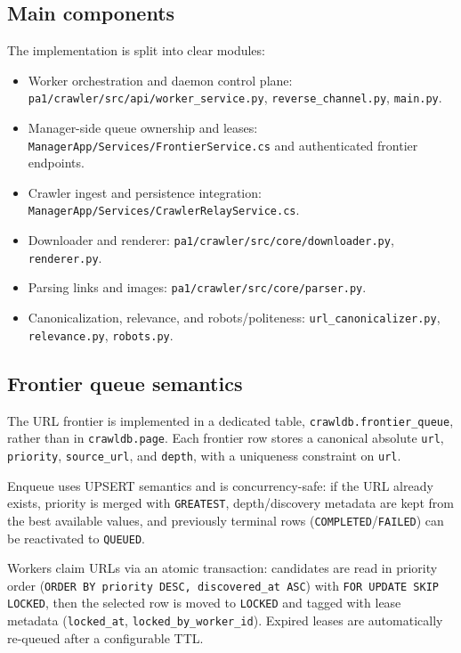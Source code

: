 \documentclass[9pt]{IEEEtran}
\begin{document}
\subsection{Main components}
The implementation is split into clear modules:
\begin{itemize}
    \item Worker orchestration and daemon control plane: \texttt{pa1/crawler/src/api/worker\_service.py}, \texttt{reverse\_channel.py}, \texttt{main.py}.
    \item Manager-side queue ownership and leases: \texttt{ManagerApp/Services/FrontierService.cs} and authenticated frontier endpoints.
    \item Crawler ingest and persistence integration: \texttt{ManagerApp/Services/CrawlerRelayService.cs}.
    \item Downloader and renderer: \texttt{pa1/crawler/src/core/downloader.py}, \texttt{renderer.py}.
    \item Parsing links and images: \texttt{pa1/crawler/src/core/parser.py}.
    \item Canonicalization, relevance, and robots/politeness: \texttt{url\_canonicalizer.py}, \texttt{relevance.py}, \texttt{robots.py}.
\end{itemize}

\subsection{Frontier queue semantics}
The URL frontier is implemented in a dedicated table, \texttt{crawldb.frontier\_queue}, rather than in \texttt{crawldb.page}.
Each frontier row stores a canonical absolute \texttt{url}, \texttt{priority}, \texttt{source\_url}, and \texttt{depth}, with a uniqueness constraint on \texttt{url}.

Enqueue uses UPSERT semantics and is concurrency-safe: if the URL already exists, priority is merged with \texttt{GREATEST},
depth/discovery metadata are kept from the best available values, and previously terminal rows (\texttt{COMPLETED}/\texttt{FAILED}) can be reactivated to \texttt{QUEUED}.

Workers claim URLs via an atomic transaction: candidates are read in priority order
(\texttt{ORDER BY priority DESC, discovered\_at ASC}) with \texttt{FOR UPDATE SKIP LOCKED}, then the selected row is moved to \texttt{LOCKED}
and tagged with lease metadata (\texttt{locked\_at}, \texttt{locked\_by\_worker\_id}). Expired leases are automatically re-queued after a configurable TTL.
\end{document}
